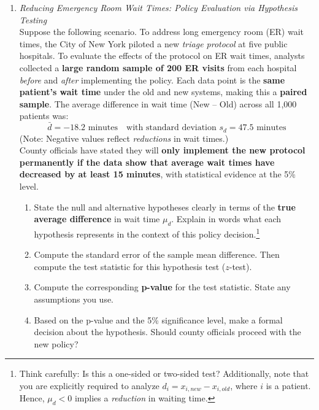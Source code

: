 \documentclass{article}
\begin{document}
\begin{enumerate}
\item \emph{Reducing Emergency Room Wait Times: Policy Evaluation via Hypothesis Testing} \\
        Suppose the following scenario. To address long emergency room (ER) wait times, the City of New York piloted a new \emph{triage protocol} at five public hospitals. To evaluate the effects of the protocol on ER wait times, analysts collected a \textbf{large random sample of 200 ER visits} from each hospital \emph{before} and \emph{after} implementing the policy. Each data point is the \textbf{same patient's wait time} under the old and new systems, making this a \textbf{paired sample}. The average difference in wait time (New – Old) across all 1,000 patients was:
        \[
        \bar{d} = -18.2 \text{ minutes} \quad \text{with standard deviation } s_d = 47.5 \text{ minutes}
        \]
        (Note: Negative values reflect \emph{reductions} in wait times.) \\
        County officials have stated they will \textbf{only implement the new protocol permanently if the data show that average wait times have decreased by at least 15 minutes}, with statistical evidence at the 5\% level.
        
        \begin{enumerate}[label=(\alph*)]
          \item State the null and alternative hypotheses clearly in terms of the \textbf{true average difference} in wait time \(\mu_d\). Explain in words what each hypothesis represents in the context of this policy decision.\footnote{Think carefully: Is this a one-sided or two-sided test? Additionally, note that you are explicitly required to analyze $d_i = x_{i,new} - x_{i,old}$, where $i$ is a patient. Hence, $\mu_d<0$ implies a \emph{reduction} in waiting time.}
        
          \item Compute the standard error of the sample mean difference. Then compute the test statistic for this hypothesis test ($z$-test).
        
          \item Compute the corresponding \textbf{p-value} for the test statistic. State any assumptions you use.
        
          \item Based on the p-value and the 5\% significance level, make a formal decision about the hypothesis. Should county officials proceed with the new policy?
        

\end{enumerate}
\end{enumerate}
\end{document}
